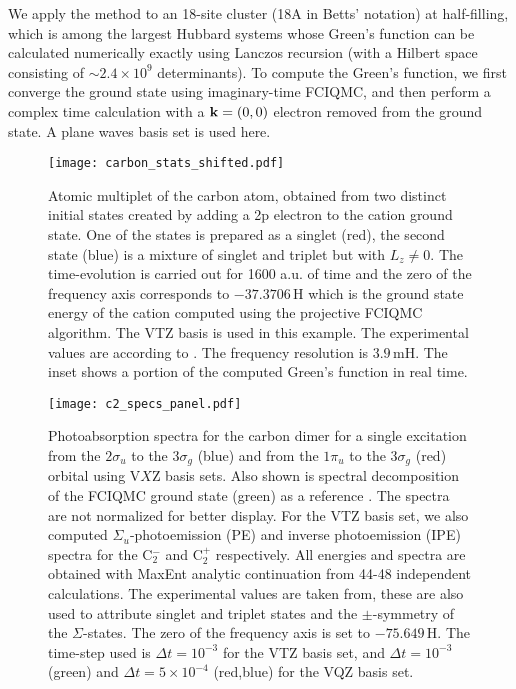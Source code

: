 \documentclass[aps,prl,twocolumn,showpacs,superscriptaddress,floatfix]{revtex4-1}
\begin{document}
We apply the method to an 18-site cluster (18A in Betts' notation\cite{Bett}) at half-filling, 
which is among the largest Hubbard systems whose Green's function can be calculated 
numerically exactly using Lanczos recursion \cite{Parlett,Gunnarsson1986} 
(with a Hilbert space  consisting of $\sim 2.4\times 10^9$ determinants).
To compute the Green's function, we first converge the ground state using 
imaginary-time FCIQMC, and then perform a complex time calculation with
a ${\bf k}=(0,0)$ electron removed from the ground state. A plane waves basis set is  used
here.

\begin{figure}[t!]
\centering
\texttt{[image: carbon\_stats\_shifted.pdf]}
\caption{Atomic multiplet of the carbon atom, obtained from two distinct initial states created by
  adding a 2p electron to the cation ground state. One of the states is
  prepared as a singlet (red), the second state (blue) is a mixture of singlet and
  triplet but with $L_z\neq 0$. The time-evolution is carried out
  for 1600 a.u. of time and the zero of the frequency axis corresponds
to $-37.3706\,\mathrm{H}$ which is the ground state energy of the cation
computed using the projective FCIQMC algorithm. The VTZ basis is used in this example. 
The experimental values are
according to \cite{KW1966}. The frequency resolution is $3.9\,\mathrm{mH}$. The inset shows a portion of the computed Green's function in real time. 
}
\label{fig:panelCarbonStats}
\end{figure}

\begin{figure}[t!]
\centering
\texttt{[image: c2\_specs\_panel.pdf]}
\caption{Photoabsorption spectra for the carbon dimer for a single excitation
  from the $2\sigma_u$ to the $3\sigma_g$ (blue) and from the $1\pi_u$ to the
  $3\sigma_g$ (red) orbital using V$X$Z basis sets. Also 
  shown is spectral decomposition of the FCIQMC ground state (green) as a
  reference . The spectra are not normalized for better display. For the VTZ basis
  set, we also computed $\Sigma_u$-photoemission (PE) and inverse photoemission (IPE) spectra for
  the C$_2^-$ and  C$_2^+$ respectively. All energies and spectra are
  obtained with MaxEnt analytic continuation from 44-48 independent calculations. The experimental values are taken from\cite{M1992}, these are also used to
  attribute singlet and triplet states and the $\pm$-symmetry of the $\Sigma$-states. The zero of the frequency axis is set to
$-75.649\,\mathrm{H}$. The time-step used is $\Delta
t=10^{-3}$ for the VTZ basis set, and
$\Delta t= 10^{-3}$ (green) and $\Delta t = 5\times 10^{-4}$ (red,blue) for the VQZ basis set.
}
\label{fig:panelCarbonDimer}
\end{figure}
\end{document}
